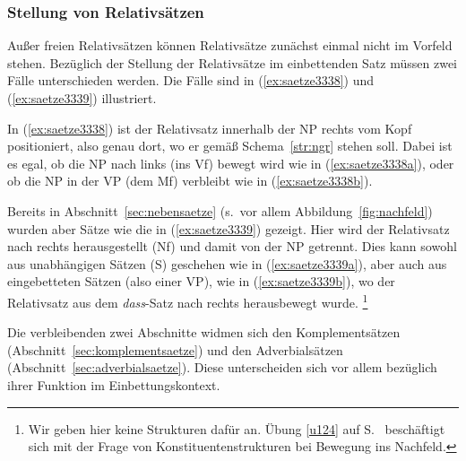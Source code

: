 \subsubsection{Stellung von Relativsätzen}

\label{sec:relativsatzstellung}

Außer freien Relativsätzen können Relativsätze zunächst einmal nicht im Vorfeld stehen.
Bezüglich der Stellung der Relativsätze im einbettenden Satz müssen zwei Fälle unterschieden werden.
Die Fälle sind in (\ref{ex:saetze3338}) und (\ref{ex:saetze3339}) illustriert.

\begin{exe}
  \ex\label{ex:saetze3338}
  \begin{xlist}
  \end{xlist}
  \ex\label{ex:saetze3339}
  \begin{xlist}
  \end{xlist}
\end{exe}

In (\ref{ex:saetze3338}) ist der Relativsatz innerhalb der NP rechts vom Kopf positioniert, also genau dort, wo er gemäß Schema~\ref{str:ngr} stehen soll.
Dabei ist es egal, ob die NP nach links (ins Vf) bewegt wird wie in (\ref{ex:saetze3338a}), oder ob die NP in der VP (dem Mf) verbleibt wie in (\ref{ex:saetze3338b}).

Bereits in Abschnitt~\ref{sec:nebensaetze} (s.\ vor allem Abbildung~\ref{fig:nachfeld}) wurden aber Sätze wie die in (\ref{ex:saetze3339}) gezeigt.
Hier wird der Relativsatz nach rechts herausgestellt (Nf) und damit von der NP getrennt.
Dies kann sowohl aus unabhängigen Sätzen (S) geschehen wie in (\ref{ex:saetze3339a}), aber auch aus eingebetteten Sätzen (also einer VP), wie in (\ref{ex:saetze3339b}), wo der Relativsatz aus dem \textit{dass}-Satz nach rechts herausbewegt wurde.%
\footnote{Wir geben hier keine Strukturen dafür an.
Übung \ref{u124} auf S.~\pageref{u124} beschäftigt sich mit der Frage von Konstituentenstrukturen bei Bewegung ins Nachfeld.}

Die verbleibenden zwei Abschnitte widmen sich den Komplementsätzen (Abschnitt~\ref{sec:komplementsaetze}) und den Adverbialsätzen (Abschnitt~\ref{sec:adverbialsaetze}).
Diese unterscheiden sich vor allem bezüglich ihrer Funktion im Einbettungskontext.

